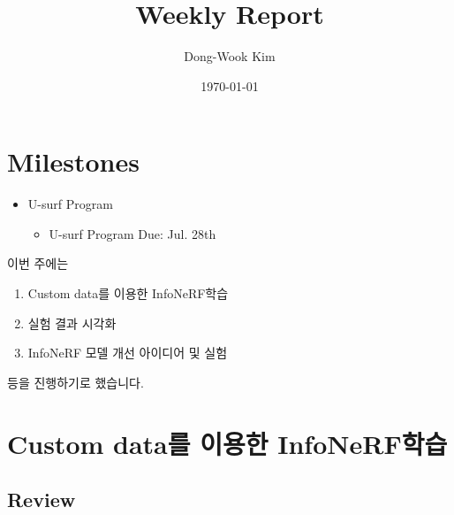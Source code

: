 \documentclass{vipweekly}
\title{Weekly Report} %
\author{Dong-Wook Kim} %
\date{\today} %
\begin{document}
\maketitle
\hypersetup{citecolor=blue}

\section*{Milestones}
\begin{itemize} 
    \item U-surf Program \\
    \begin{itemize}
        \item U-surf Program Due: Jul. 28th\\
    \end{itemize}
\end{itemize}
이번 주에는 
\begin{enumerate}
    \item Custom data를 이용한 InfoNeRF학습
    \item 실험 결과 시각화
    \item InfoNeRF 모델 개선 아이디어 및 실험
    
\end{enumerate} 
등을 진행하기로 했습니다.


\section{Custom data를 이용한 InfoNeRF학습}

\subsection{Review}
\end{document}
